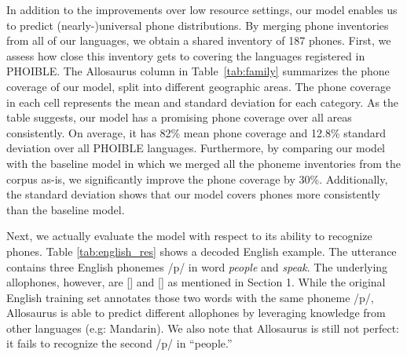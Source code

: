 \documentclass{article}
\begin{document}
In addition to the improvements over low resource settings, our model enables us to predict (nearly-)universal phone distributions.
By merging phone inventories from all of our languages, we obtain a shared inventory of 187 phones. First, we assess how close this inventory gets to covering the languages registered in PHOIBLE.
The Allosaurus column in Table~\ref{tab:family} summarizes the phone coverage of our model, split into different geographic areas.
The phone coverage in each cell represents the mean and standard deviation for each category. As the table suggests, our model has a promising phone coverage over all areas consistently. On average, it has 82\% mean phone coverage and 12.8\% standard deviation over all PHOIBLE languages.
Furthermore, by comparing our model with the baseline model in which we merged all the phoneme inventories from the corpus as-is, we significantly improve the phone coverage by 30\%. Additionally, the standard deviation shows that our model covers phones more consistently than the baseline model.

Next, we actually evaluate the model with respect to its ability to recognize phones. Table \ref{tab:english_res} shows a decoded English example. The utterance contains three English phonemes /p/ in word \textit{people} and \textit{speak}. The underlying allophones, however, are [] and [] as mentioned in Section 1. While the original English training set annotates those two words with the same phoneme /p/, Allosaurus is able to predict different allophones by leveraging knowledge from other languages (e.g: Mandarin). We also note that Allosaurus is still not perfect: it fails to recognize the second /p/ in ``people.''
\end{document}
